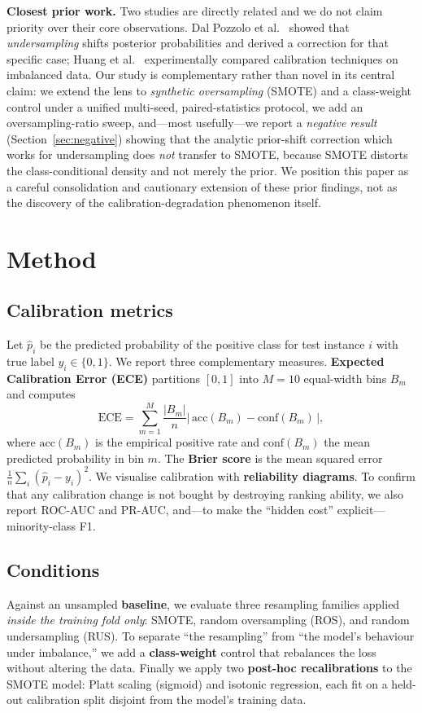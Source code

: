 \documentclass[conference]{IEEEtran}
\begin{document}
\textbf{Closest prior work.} Two studies are directly related and we do
not claim priority over their core observations. Dal Pozzolo et
al.~\cite{dalpozzolo2015calibrating} showed that \emph{undersampling}
shifts posterior probabilities and derived a correction for that specific
case; Huang et al.~\cite{huang2020experimental} experimentally compared
calibration techniques on imbalanced data. Our study is complementary
rather than novel in its central claim: we extend the lens to
\emph{synthetic oversampling} (SMOTE) and a class-weight control under a
unified multi-seed, paired-statistics protocol, we add an
oversampling-ratio sweep, and---most usefully---we report a
\emph{negative result} (Section~\ref{sec:negative}) showing that the
analytic prior-shift correction which works for undersampling does
\emph{not} transfer to SMOTE, because SMOTE distorts the class-conditional
density and not merely the prior. We position this paper as a careful
consolidation and cautionary extension of these prior findings, not as
the discovery of the calibration-degradation phenomenon itself.

\section{Method}
\subsection{Calibration metrics}
Let $\hat{p}_i$ be the predicted probability of the positive class for
test instance $i$ with true label $y_i\in\{0,1\}$. We report three
complementary measures. \textbf{Expected Calibration Error (ECE)}
partitions $[0,1]$ into $M=10$ equal-width bins $B_m$ and computes
\begin{equation}
\mathrm{ECE}=\sum_{m=1}^{M}\frac{|B_m|}{n}
\bigl|\,\mathrm{acc}(B_m)-\mathrm{conf}(B_m)\,\bigr|,
\end{equation}
where $\mathrm{acc}(B_m)$ is the empirical positive rate and
$\mathrm{conf}(B_m)$ the mean predicted probability in bin $m$. The
\textbf{Brier score} is the mean squared error
$\frac{1}{n}\sum_i(\hat{p}_i-y_i)^2$. We visualise calibration with
\textbf{reliability diagrams}. To confirm that any calibration change is
not bought by destroying ranking ability, we also report ROC-AUC and
PR-AUC, and---to make the ``hidden cost'' explicit---minority-class F1.

\subsection{Conditions}
Against an unsampled \textbf{baseline}, we evaluate three resampling
families applied \emph{inside the training fold only}: SMOTE, random
oversampling (ROS), and random undersampling (RUS). To separate ``the
resampling'' from ``the model's behaviour under imbalance,'' we add a
\textbf{class-weight} control that rebalances the loss without altering
the data. Finally we apply two \textbf{post-hoc recalibrations} to the
SMOTE model: Platt scaling (sigmoid) and isotonic regression, each fit on
a held-out calibration split disjoint from the model's training data.
\end{document}
